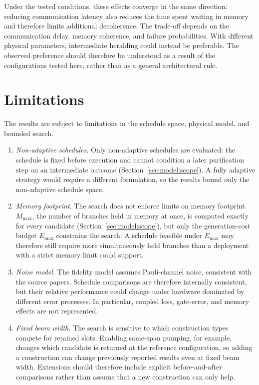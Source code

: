 Under the tested conditions, these effects converge in the same direction: reducing communication latency also reduces the time spent waiting in memory and therefore limits additional decoherence. The trade-off depends on the communication delay, memory coherence, and failure probabilities. With different physical parameters, intermediate heralding could instead be preferable. The observed preference should therefore be understood as a result of the configurations tested here, rather than as a general architectural rule.

\section{Limitations}
\label{sec:disc:limitations}


The results are subject to limitations in the schedule space, physical model, and bounded search.

\begin{enumerate}
    \item \textit{Non-adaptive schedules.} Only non-adaptive schedules are evaluated: the schedule is fixed before execution and cannot condition a later purification step on an intermediate outcome (Section~\ref{sec:model:scope}). A fully adaptive strategy would require a different formulation, so the results bound only the non-adaptive schedule space.

    \item \textit{Memory footprint.} The search does not enforce limits on memory footprint. $M_{\max}$, the number of branches held in memory at once, is computed exactly for every candidate (Section~\ref{sec:model:scope}), but only the generation-cost budget $E_{\max}$ constrains the search. A schedule feasible under $E_{\max}$ may therefore still require more simultaneously held branches than a deployment with a strict memory limit could support.

    \item \textit{Noise model.} The fidelity model assumes Pauli-channel noise, consistent with the source papers. Schedule comparisons are therefore internally consistent, but their relative performance could change under hardware dominated by different error processes. In particular, coupled loss, gate-error, and memory effects are not represented.

    \item \textit{Fixed beam width.} The search is sensitive to which construction types compete for retained slots. Enabling same-span pumping, for example, changes which candidate is returned at the reference configuration, so adding a construction can change previously reported results even at fixed beam width. Extensions should therefore include explicit before-and-after comparisons rather than assume that a new construction can only help.
\end{enumerate}
